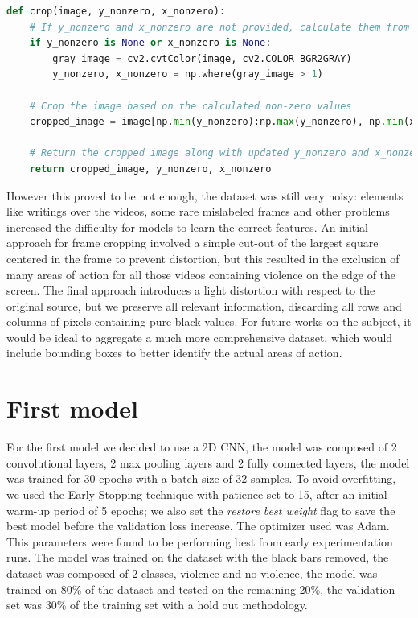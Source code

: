 \begin{lstlisting}[language=Python, caption={Image Cropper}, label={lst:ImageCropper}]
def crop(image, y_nonzero, x_nonzero):
    # If y_nonzero and x_nonzero are not provided, calculate them from the grayscale version of the image
    if y_nonzero is None or x_nonzero is None:
        gray_image = cv2.cvtColor(image, cv2.COLOR_BGR2GRAY)
        y_nonzero, x_nonzero = np.where(gray_image > 1)

    # Crop the image based on the calculated non-zero values
    cropped_image = image[np.min(y_nonzero):np.max(y_nonzero), np.min(x_nonzero):np.max(x_nonzero)]

    # Return the cropped image along with updated y_nonzero and x_nonzero values
    return cropped_image, y_nonzero, x_nonzero
\end{lstlisting}

However this proved to be not enough, the dataset was still very noisy: elements like writings over the videos, some rare mislabeled frames and other problems increased the difficulty for models to learn the correct features. An initial approach for frame cropping involved a simple cut-out of the largest square centered in the frame to prevent distortion, but this resulted in the exclusion of many areas of action for all those videos containing violence on the edge of the screen. The final approach introduces a light distortion with respect to the original source, but we preserve all relevant information, discarding all rows and columns of pixels containing pure black values. For future works on the subject, it would be ideal to aggregate a much more comprehensive dataset, which would include bounding boxes to better identify the actual areas of action.

\section{First model}
For the first model we decided to use a 2D CNN, the model was composed of 2 convolutional layers, 2 max pooling layers and 2 fully connected layers, the model was trained for 30 epochs with a batch size of 32 samples. To avoid overfitting, we used the Early Stopping technique with patience set to 15, after an initial warm-up period of 5 epochs; we also set the \textit{restore best weight} flag to save the best model before the validation loss increase. The optimizer used was Adam. This parameters were found to be performing best from early experimentation runs. The model was trained on the dataset with the black bars removed, the dataset was composed of 2 classes, violence and no-violence, the model was trained on 80\% of the dataset and tested on the remaining 20\%, the validation set was 30\% of the training set with a hold out methodology.  

